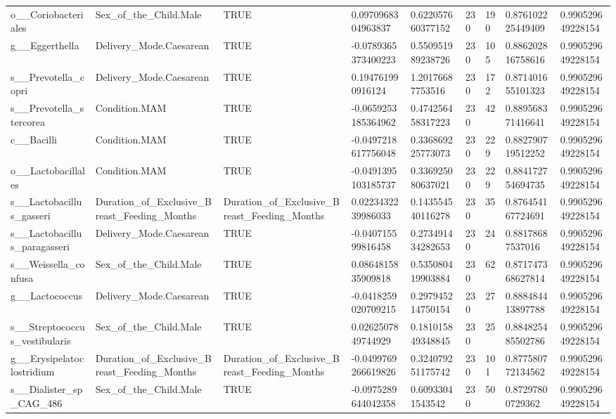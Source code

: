 \begin{longtable}{lllllllll}
o\_\_Coriobacteriales & Sex\_of\_the\_Child.Male & TRUE & 0.0970968304963837 & 0.622057660377152 & 230 & 190 & 0.876102225449409 & 0.990529649228154 \\
g\_\_Eggerthella & Delivery\_Mode.Caesarean & TRUE & -0.0789365373400223 & 0.550951989238726 & 230 & 105 & 0.886202816758616 & 0.990529649228154 \\
s\_\_Prevotella\_copri & Delivery\_Mode.Caesarean & TRUE & 0.194761990916124 & 1.20176687753516 & 230 & 172 & 0.871401655101323 & 0.990529649228154 \\
s\_\_Prevotella\_stercorea & Condition.MAM & TRUE & -0.0659253185364962 & 0.474256458317223 & 230 & 42 & 0.889568371416641 & 0.990529649228154 \\
c\_\_Bacilli & Condition.MAM & TRUE & -0.0497218617756048 & 0.336869225773073 & 230 & 229 & 0.882790719512252 & 0.990529649228154 \\
o\_\_Lactobacillales & Condition.MAM & TRUE & -0.0491395103185737 & 0.336925080637021 & 230 & 229 & 0.884172754694735 & 0.990529649228154 \\
s\_\_Lactobacillus\_gasseri & Duration\_of\_Exclusive\_Breast\_Feeding\_Months & Duration\_of\_Exclusive\_Breast\_Feeding\_Months & 0.0223432239986033 & 0.143554540116278 & 230 & 35 & 0.876454167724691 & 0.990529649228154 \\
s\_\_Lactobacillus\_paragasseri & Delivery\_Mode.Caesarean & TRUE & -0.040715599816458 & 0.273491434282653 & 230 & 24 & 0.88178687537016 & 0.990529649228154 \\
s\_\_Weissella\_confusa & Sex\_of\_the\_Child.Male & TRUE & 0.0864815835909818 & 0.535080419903884 & 230 & 62 & 0.871747368627814 & 0.990529649228154 \\
g\_\_Lactococcus & Delivery\_Mode.Caesarean & TRUE & -0.0418259020709215 & 0.297945214750154 & 230 & 27 & 0.888484413897788 & 0.990529649228154 \\
s\_\_Streptococcus\_vestibularis & Sex\_of\_the\_Child.Male & TRUE & 0.0262507849744929 & 0.181015849348845 & 230 & 25 & 0.884825485502786 & 0.990529649228154 \\
g\_\_Erysipelatoclostridium & Duration\_of\_Exclusive\_Breast\_Feeding\_Months & Duration\_of\_Exclusive\_Breast\_Feeding\_Months & -0.0499769266619826 & 0.324079251175742 & 230 & 101 & 0.877580772134562 & 0.990529649228154 \\
s\_\_Dialister\_sp\_CAG\_486 & Sex\_of\_the\_Child.Male & TRUE & -0.0975289644042358 & 0.60933041543542 & 230 & 50 & 0.87297800729362 & 0.990529649228154 \\

\end{longtable}
